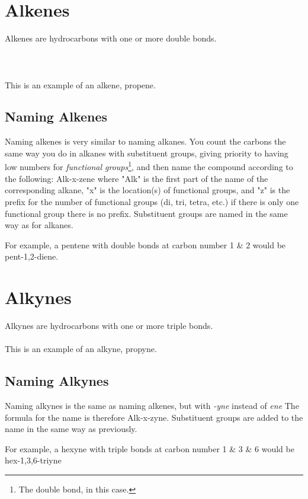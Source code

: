\documentclass[11pt,twoside]{article}
\begin{document}
	\tableofcontents
	
	\section{Alkenes}
		Alkenes are hydrocarbons with one or more double bonds.
		\\ \\
		\\ \\
		This is an example of an alkene, propene.
		\subsection{Naming Alkenes}
			Naming alkenes is very similar to naming alkanes. You count the carbons the same way you do in alkanes with substituent groups, giving priority to having low numbers for \emph{functional groups}\footnote{The double bond, in this case.}, and then name the compound according to the following: Alk-x-zene where "Alk" is the first part of the name of the corresponding alkane, "x" is the location(s) of functional groups, and "z" is the prefix for the number of functional groups (di, tri, tetra, etc.) if there is only one functional group there is no prefix. Substituent groups are named in the same way as for alkanes.
			
			For example, a pentene with double bonds at carbon number 1 \& 2 would be pent-1,2-diene. 
			
	\section{Alkynes}
		Alkynes are hydrocarbons with one or more triple bonds.
		\\
		\\
		This is an example of an alkyne, propyne.
		\subsection{Naming Alkynes}
			Naming alkynes is the same as naming alkenes, but with \emph{-yne} instead of \emph{ene} The formula for the name is therefore Alk-x-zyne. Substituent groups are added to the name in the same way as previously.
			
			For example, a hexyne with triple bonds at carbon number 1 \& 3 \& 6 would be hex-1,3,6-triyne
\end{document}
